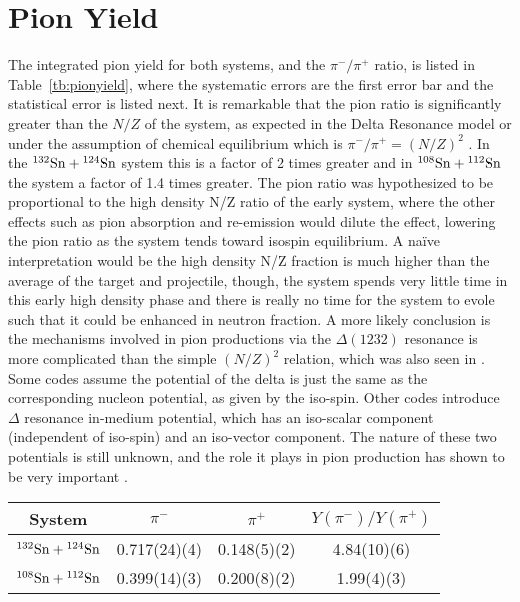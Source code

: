 \section{Pion Yield}

The integrated pion yield for both systems, and the $\pi^-/\pi^+$ ratio, is listed in Table~\ref{tb:pionyield}, where the systematic errors are the first error bar and the statistical error is listed next. It is remarkable that the pion ratio is significantly greater than the $N/Z$ of the system, as expected in the Delta Resonance model or under the assumption of chemical equilibrium which is $\pi^-/\pi^+ = (N/Z)^2$ \cite{baoan_piprod1,baoan_piprod2}. In the ${}^{132}\mathrm{Sn} + {}^{124}\mathrm{Sn}$ system this is a factor of 2 times greater and in ${}^{108}\mathrm{Sn} + {}^{112}\mathrm{Sn}$ the system a factor of 1.4 times greater. The pion ratio was hypothesized to be proportional to the high density N/Z ratio of the early system, where the other effects such as pion absorption and re-emission would dilute the effect, lowering the pion ratio as the system tends toward isospin equilibrium. A na\"ive interpretation would be the high density N/Z fraction is much higher than the average of the target and projectile, though, the system spends very little time in this early high density phase and there is really no time for the system to evole such that it could be enhanced in neutron fraction. A more likely conclusion is the mechanisms involved in pion productions via the $\Delta(1232)$ resonance is more complicated than the simple $(N/Z)^2$ relation, which was also seen in \cite{fopi}. Some codes assume the potential of the delta is just the same as the corresponding nucleon potential, as given by the iso-spin. Other codes introduce $\Delta$ resonance in-medium potential, which has an iso-scalar component (independent of iso-spin) and an iso-vector component.  The nature of these two potentials is still unknown, and the role it plays in pion production has shown to be very important \cite{baoan_deltapotential}.


\begin{table*}\centering
{}
\begin{tabular}{@{}cccc@{}}\toprule
System & $\pi^-$ & $\pi^+$ & $Y(\pi^-)/Y(\pi^+)$  \\
\midrule
${}^{132}\mathrm{Sn} + {}^{124}\mathrm{Sn}$ & 0.717(24)(4) & 0.148(5)(2) & 4.84(10)(6)  \\
${}^{108}\mathrm{Sn} + {}^{112}\mathrm{Sn}$ & 0.399(14)(3) & 0.200(8)(2) & 1.99(4)(3)  \\
\bottomrule
\end{tabular}
\caption{Total pion yield.}
\label{tb:pionyield}
\end{table*}


